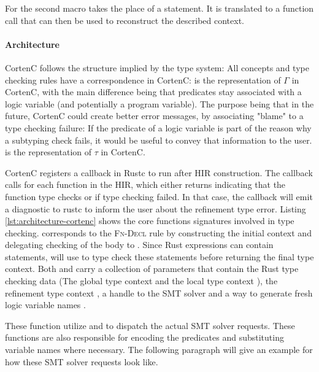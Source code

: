 \documentclass[twoside, english]{sdqthesis}
\theoremstyle{definition}
\begin{document}
For the second macro  takes the place of a statement. 
It is translated to a function call that can then be used to reconstruct the described context.

\paragraph{Architecture}
CortenC follows the structure implied by the type system: All concepts and type checking rules have a correspondence in CortenC:
 is the representation of $\Gamma$ in CortenC, with the main difference being that predicates stay associated with a logic variable (and potentially a program variable). The purpose being that in the future, CortenC could create better error messages, by associating "blame" to a type checking failure: If the predicate of a logic variable is part of the reason why a subtyping check fails, it would be useful to convey that information to the user. 
 is the representation of $\tau$ in CortenC.

CortenC registers a callback in Rustc to run after HIR construction. The callback calls  for each function in the HIR, which either returns  indicating that the function type checks or  if type checking failed. In that case, the callback will emit a diagnostic to rustc to inform the user about the refinement type error.
Listing \ref{lst:architecture-cortenc} shows the core functions signatures involved in type checking.  corresponds to the \textsc{Fn-Decl} rule by constructing the initial context and delegating checking of the body to . 
Since Rust expressions can contain statements,  will use  to type check these statements before returning the final type context.
Both  and  carry a collection of parameters that contain the Rust type checking data (The global type context  and the local type context ), the refinement type context , a handle to the SMT solver  and a way to generate fresh logic variable names .

These function utilize  and  to dispatch the actual SMT solver requests. These functions are also responsible for encoding the predicates and substituting variable names where necessary. 
The following paragraph will give an example for how these SMT solver requests look like.
\end{document}
